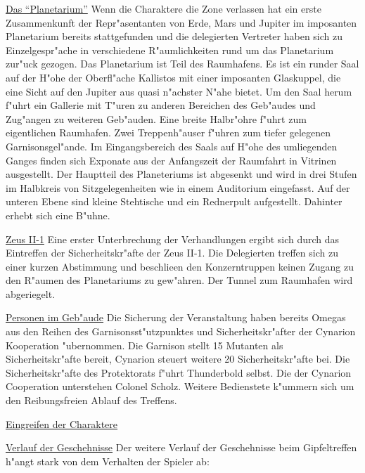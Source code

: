 
\underline{Das "`Planetarium"'} Wenn die Charaktere die Zone verlassen hat ein erste Zusammenkunft der Repr"asentanten von Erde, Mars und Jupiter im imposanten Planetarium bereits stattgefunden und die delegierten Vertreter haben sich zu Einzelgespr"ache in verschiedene R"aumlichkeiten rund um das Planetarium zur"uck gezogen. Das Planetarium ist Teil des Raumhafens. Es ist ein runder Saal auf der H"ohe der Oberfl"ache Kallistos mit einer imposanten Glaskuppel, die eine Sicht auf den Jupiter aus quasi n"achster N"ahe bietet. Um den Saal herum f"uhrt ein Gallerie mit T"uren zu anderen Bereichen des Geb"audes und Zug"angen zu weiteren Geb"auden. Eine breite Halbr"ohre f"uhrt zum eigentlichen Raumhafen. Zwei Treppenh"auser f"uhren zum tiefer gelegenen Garnisonsgel"ande. Im Eingangsbereich des Saals auf H"ohe des umliegenden Ganges finden sich Exponate aus der Anfangszeit der Raumfahrt in Vitrinen ausgestellt. Der Hauptteil des Planeteriums ist abgesenkt und wird in drei Stufen im Halbkreis von Sitzgelegenheiten wie in einem Auditorium eingefasst. Auf der unteren Ebene sind kleine Stehtische und ein Rednerpult aufgestellt. Dahinter erhebt sich eine B"uhne.

\underline{Zeus II-1} Eine erster Unterbrechung der Verhandlungen ergibt sich durch das Eintreffen der Sicherheitskr"afte der Zeus II-1. Die Delegierten treffen sich zu einer kurzen Abstimmung und beschlie\3en den Konzerntruppen keinen Zugang zu den R"aumen des Planetariums zu gew"ahren. Der Tunnel zum Raumhafen wird abgeriegelt. 

\underline{Personen im Geb"aude} Die Sicherung der Veranstaltung haben bereits Omegas aus den Reihen des Garnisonsst"utzpunktes und Sicherheitskr"after der Cynarion Kooperation "ubernommen. Die Garnison stellt 15 Mutanten als Sicherheitskr"afte bereit, Cynarion steuert weitere 20 Sicherheitskr"afte bei. Die Sicherheitskr"afte des Protektorats f"uhrt Thunderbold selbst. Die der Cynarion Cooperation unterstehen Colonel Scholz. Weitere Bedienstete k"ummern sich um den Reibungsfreien Ablauf des Treffens.

\underline{Eingreifen der Charaktere}

\underline{Verlauf der Geschehnisse} Der weitere Verlauf der Geschehnisse beim Gipfeltreffen h"angt stark von dem Verhalten der Spieler ab:

